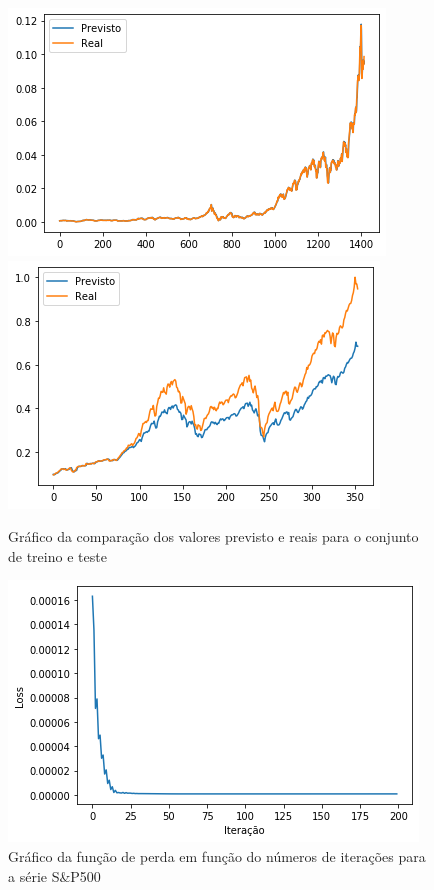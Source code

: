 \documentclass[
    12pt,
    oneside,
    a4paper,
    english,
    brazil
]{abntex2}
\begin{document}
\begin{figure}[ht]
    \centering
    \caption{Gráfico da comparação dos valores previsto e reais para o conjunto de treino e teste}\label{fig:sp500_overfit}
        \includegraphics[width=\linewidth]{images/sp500_overfit_train.png}
    \endminipage\hfill
        \includegraphics[width=\linewidth]{images/sp500_overfit_test.png}
    \endminipage\hfill
\end{figure}

\begin{figure}[ht]
    \centering
    \caption{Gráfico da função de perda em  função do números de iterações para
    a série S\&P500}\label{fig:iter_sp500_overfit}
    \includegraphics[width=.5\linewidth]{images/sp500_overfit_iter.png}
\end{figure}
\end{document}
